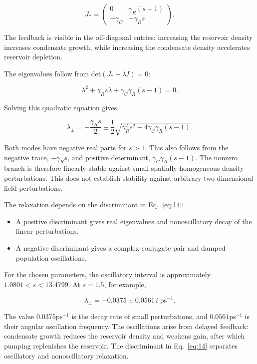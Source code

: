 \documentclass[12pt,a4paper]{article}
\begin{document}
\[
J_*=\begin{pmatrix}0&\gamma_R(s-1)\\-\gamma_C&-\gamma_Rs\end{pmatrix}.
\]

The feedback is visible in the off-diagonal entries: increasing the reservoir density increases condensate growth, while increasing the condensate density accelerates reservoir depletion.

The eigenvalues follow from det$(J_{*}-\lambda I)=0$:

\[
\lambda^2+\gamma_Rs\lambda+\gamma_C\gamma_R(s-1)=0.
\]

Solving this quadratic equation gives

\begin{equation}\label{eq:14}
\lambda_\pm=-\frac{\gamma_Rs}{2}\pm\frac12\sqrt{\gamma_R^2s^2-4\gamma_C\gamma_R(s-1)}.\end{equation}

Both modes have negative real parts for $s>1$. This also follows from the negative trace, $-\gamma_{R} s$, and positive determinant, $\gamma_{C} \gamma_{R}(s-1)$. The nonzero branch is therefore linearly stable against small spatially homogeneous density perturbations. This does not establish stability against arbitrary two-dimensional field perturbations.

The relaxation depends on the discriminant in Eq.~\eqref{eq:14}:

\begin{itemize}\setlength{\itemsep}{3pt}\item A positive discriminant gives real eigenvalues and nonoscillatory decay of the linear perturbations.\end{itemize}

\begin{itemize}\setlength{\itemsep}{3pt}\item A negative discriminant gives a complex-conjugate pair and damped population oscillations.\end{itemize}

For the chosen parameters, the oscillatory interval is approximately $1.0801<s<13.4799$. At $s=1.5$, for example,

\begin{equation}\label{eq:15}
\lambda_\pm=-0.0375\pm0.0561\,i\;\mathrm{ps}^{-1}.\end{equation}

The value $0.0375 \mathrm{ps}^{-1}$ is the decay rate of small perturbations, and $0.0561 \mathrm{ps}^{-1}$ is their angular oscillation frequency. The oscillations arise from delayed feedback: condensate growth reduces the reservoir density and weakens gain, after which pumping replenishes the reservoir. The discriminant in Eq.~\eqref{eq:14} separates oscillatory and nonoscillatory relaxation.
\end{document}
